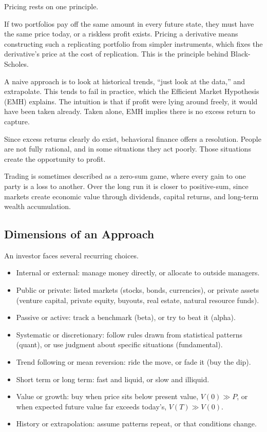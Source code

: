Pricing rests on one principle.

\begin{keybox}
If two portfolios pay off the same amount in every future state, they must have the same price today, or a riskless profit exists. Pricing a derivative means constructing such a replicating portfolio from simpler instruments, which fixes the derivative's price at the cost of replication. This is the principle behind Black-Scholes.
\end{keybox}

A naive approach is to look at historical trends, ``just look at the data,'' and extrapolate. This tends to fail in practice, which the Efficient Market Hypothesis (EMH) explains. The intuition is that if profit were lying around freely, it would have been taken already. Taken alone, EMH implies there is no excess return to capture.

Since excess returns clearly do exist, behavioral finance offers a resolution. People are not fully rational, and in some situations they act poorly. Those situations create the opportunity to profit.

Trading is sometimes described as a zero-sum game, where every gain to one party is a loss to another. Over the long run it is closer to positive-sum, since markets create economic value through dividends, capital returns, and long-term wealth accumulation.

\bigskip

\subsection{Dimensions of an Approach}

\medskip

An investor faces several recurring choices.
\begin{itemize}[label=--]
    \item Internal or external: manage money directly, or allocate to outside managers.
    \item Public or private: listed markets (stocks, bonds, currencies), or private assets (venture capital, private equity, buyouts, real estate, natural resource funds).
    \item Passive or active: track a benchmark (beta), or try to beat it (alpha).
    \item Systematic or discretionary: follow rules drawn from statistical patterns (quant), or use judgment about specific situations (fundamental).
    \item Trend following or mean reversion: ride the move, or fade it (buy the dip).
    \item Short term or long term: fast and liquid, or slow and illiquid.
    \item Value or growth: buy when price sits below present value, \(V(0) \gg P\), or when expected future value far exceeds today's, \(V(T) \gg V(0)\).
    \item History or extrapolation: assume patterns repeat, or that conditions change.
\end{itemize}


